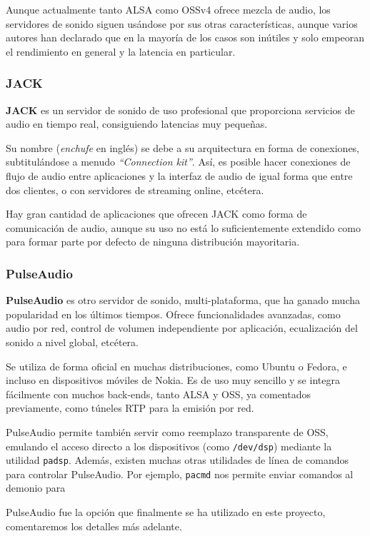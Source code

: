 Aunque actualmente tanto ALSA como OSSv4 ofrece mezcla de audio, los servidores
de sonido siguen usándose por sus otras características, aunque varios autores
han declarado que en la mayoría de los casos son inútiles y solo empeoran el
rendimiento en general y la latencia en particular.

\subsubsection{JACK}

\textbf{JACK} es un servidor de sonido de uso profesional que proporciona
servicios de audio en tiempo real, consiguiendo latencias muy pequeñas. 

Su nombre (\textit{enchufe} en inglés) se debe a su arquitectura en forma de
conexiones, subtitulándose a menudo \textit{``Connection kit''}. Así, es posible
hacer conexiones de flujo de audio entre aplicaciones y la interfaz de audio de
igual forma que entre dos clientes, o con servidores de streaming online,
etcétera.

Hay gran cantidad de aplicaciones que ofrecen JACK como forma de comunicación de
audio, aunque su uso no está lo suficientemente extendido como para formar parte
por defecto de ninguna distribución mayoritaria.

\subsubsection{PulseAudio}
\textbf{PulseAudio} es otro servidor de sonido, multi-plataforma, que ha ganado
mucha popularidad en los últimos tiempos. Ofrece funcionalidades avanzadas, como
audio por red, control de volumen independiente por aplicación, ecualización del
sonido a nivel global, etcétera.

Se utiliza de forma oficial en muchas distribuciones, como Ubuntu o Fedora, e
incluso en dispositivos móviles de Nokia. Es de uso muy sencillo y se integra
fácilmente con muchos back-ends, tanto ALSA y OSS, ya comentados previamente,
como túneles RTP para la emisión por red.

PulseAudio permite también servir como reemplazo transparente de OSS, emulando
el acceso directo a los dispositivos (como \texttt{/dev/dsp}) mediante la
utilidad \texttt{padsp}. Además, existen muchas otras utilidades de línea de
comandos para controlar PulseAudio. Por ejemplo, \texttt{pacmd} nos permite
enviar comandos al demonio para 

PulseAudio fue la opción que finalmente se ha utilizado en este proyecto,
comentaremos los detalles más adelante.

